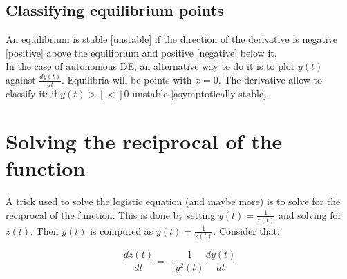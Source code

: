 	\subsection{Classifying equilibrium points}
	An equilibrium is stable [unstable] if the direction of the derivative is negative [positive] above the equilibrium and positive [negative] below it.\\
	In the case of autonomous DE, an alternative way to do it is to plot $y(t)$ against $\frac{dy(t)}{dt}$.
	Equilibria will be points with $x=0$.
	The derivative allow to classify it: if $y(t)>[<]0$ unstable [asymptotically stable].

\section{Solving the reciprocal of the function}
A trick used to solve the logistic equation (and maybe more) is to solve for the reciprocal of the function.
This is done by setting $y(t) = \frac{1}{z(t)}$ and solving for $z(t)$.
Then $y(t)$ is computed as $y(t) = \frac{1}{z(t)}$.
Consider that:

$$\frac{dz(t)}{dt} = -\frac{1}{y^2(t)}\frac{dy(t)}{dt}$$









